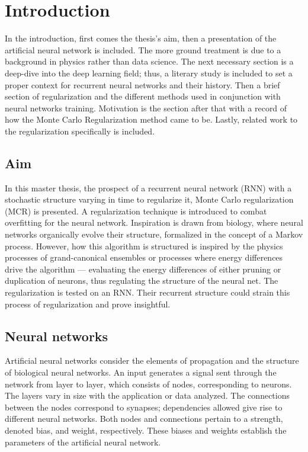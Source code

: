 
\chapter{Introduction}

In the introduction, first comes the thesis's aim, then a presentation of the artificial neural network is included. The more ground treatment is due to a background in physics rather than data science. The next necessary section is a deep-dive into the deep learning field; thus, a literary study is included to set a proper context for recurrent neural networks and their history. Then a brief section of regularization and the different methods used in conjunction with neural networks training. Motivation is the section after that with a record of how the Monte Carlo Regularization method came to be. Lastly, related work to the regularization specifically is included.

\section{Aim}

In this master thesis, the prospect of a recurrent neural network (RNN) with a stochastic structure varying in time to regularize it, Monte Carlo regularization (MCR) is presented. A regularization technique is introduced to combat overfitting for the neural network. Inspiration is drawn from biology, where neural networks organically evolve their structure, formalized in the concept of a Markov process. However, how this algorithm is structured is inspired by the physics processes of grand-canonical ensembles or processes where energy differences drive the algorithm — evaluating the energy differences of either pruning or duplication of neurons, thus regulating the structure of the neural net. The regularization is tested on an RNN. Their recurrent structure could strain this process of regularization and prove insightful. 

\section{Neural networks}

Artificial neural networks consider the elements of propagation and the structure of biological neural networks. An input generates a signal sent through the network from layer to layer, which consists of nodes, corresponding to neurons. The layers vary in size with the application or data analyzed. The connections between the nodes correspond to synapses; dependencies allowed give rise to different neural networks. Both nodes and connections pertain to a strength, denoted bias, and weight, respectively. These biases and weights establish the parameters of the artificial neural network. 

